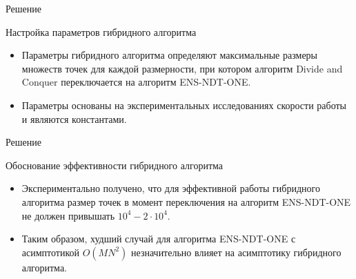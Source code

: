 \documentclass[table]{beamer}
\begin{document}
\begin{frame}{Решение}
\begin{block}{Настройка параметров гибридного алгоритма}
\begin{itemize}
\item Параметры гибридного алгоритма определяют максимальные размеры множеств точек для каждой размерности, при котором алгоритм Divide and Conquer переключается на алгоритм ENS-NDT-ONE.
\item Параметры основаны на экспериментальных исследованиях скорости работы и являются константами.
\end{itemize}
\end{block}
\end{frame}

\begin{frame}{Решение}
\begin{block}{Обоснование эффективности гибридного алгоритма}
\begin{itemize}
\item Экспериментально получено, что для эффективной работы гибридного алгоритма размер точек в момент переключения на алгоритм ENS-NDT-ONE не должен привышать $10^4 - 2 \cdot 10^4$.
\item Таким образом, худший случай для алгоритма ENS-NDT-ONE с асимптотикой $O(MN^2)$ незначительно влияет на асимптотику гибридного алгоритма.
\end{itemize}
\end{block}
\end{frame}
\end{document}
